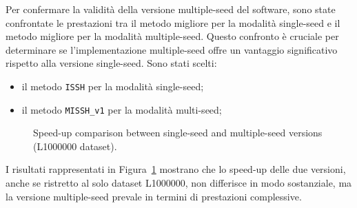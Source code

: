 	Per confermare la validità della versione multiple-seed del software, sono state confrontate le prestazioni tra il metodo migliore per la modalità single-seed e il metodo migliore per la modalità multiple-seed. Questo confronto è cruciale per determinare se l'implementazione multiple-seed offre un vantaggio significativo rispetto alla versione single-seed. Sono stati scelti:
	\begin{itemize}
		\item il metodo \verb|ISSH| per la modalità single-seed;
		\item il metodo \verb|MISSH_v1| per la modalità multi-seed;
	\end{itemize}
	
	
	\begin{figure}[!ht]
		\centering
		\caption{Speed-up comparison between single-seed and multiple-seed versions (L1000000 dataset).}
		\label{fig:single-vs-multi-seed}
	\end{figure}
	
	I risultati rappresentati in Figura~\ref{fig:single-vs-multi-seed} mostrano che lo speed-up delle due versioni, anche se ristretto al solo dataset L1000000, non differisce in modo sostanziale, ma la versione multiple-seed prevale in termini di prestazioni complessive.
